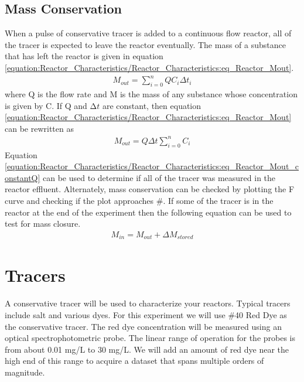 \documentclass[letterpaper,10pt,english]{sphinxmanual}
\begin{document}
\subsection{Mass Conservation}
\label{\detokenize{Reactor_Characteristics/Reactor_Characteristics:mass-conservation}}
When a pulse of conservative tracer is added to a continuous flow reactor, all of the tracer is expected to leave the reactor eventually. The mass of a substance that has left the reactor is given in equation \eqref{equation:Reactor_Characteristics/Reactor_Characteristics:eq_Reactor_Mout}.
\begin{equation}\label{equation:Reactor_Characteristics/Reactor_Characteristics:eq_Reactor_Mout}
\begin{split} M_{out} =\sum _{i=0}^{n}QC_{i} \Delta t_{i}\end{split}
\end{equation}
where Q is the flow rate and M is the mass of any substance whose concentration is given by C. If Q and \(\mathrm{\Delta}t\) are constant, then equation \eqref{equation:Reactor_Characteristics/Reactor_Characteristics:eq_Reactor_Mout} can be rewritten as
\begin{equation}\label{equation:Reactor_Characteristics/Reactor_Characteristics:eq_Reactor_Mout_constantQ}
\begin{split} M_{out} =Q\Delta t\sum _{i=0}^{n}C_{i}\end{split}
\end{equation}
Equation \eqref{equation:Reactor_Characteristics/Reactor_Characteristics:eq_Reactor_Mout_constantQ} can be used to determine if all of the tracer was measured in the reactor effluent. Alternately, mass conservation can be checked by plotting the F curve and checking if the plot approaches \#. If some of the tracer is in the reactor at the end of the experiment then the following equation can be used to test for mass closure.
\begin{equation}\label{equation:Reactor_Characteristics/Reactor_Characteristics:Reactor_Characteristics/Reactor_Characteristics:13}
\begin{split}M_{in} =M_{out} +\Delta M_{stored}\end{split}
\end{equation}

\section{Tracers}
\label{\detokenize{Reactor_Characteristics/Reactor_Characteristics:tracers}}\label{\detokenize{Reactor_Characteristics/Reactor_Characteristics:heading-reactor-tracers}}
A conservative tracer will be used to characterize your reactors. Typical tracers include salt and various dyes. For this experiment we will use \#40 Red Dye as the conservative tracer. The red dye concentration will be measured using an optical spectrophotometric probe. The linear range of operation for the probes is from about 0.01 mg/L to 30 mg/L. We will add an amount of red dye near the high end of this range to acquire a dataset that spans multiple orders of magnitude.
\end{document}
